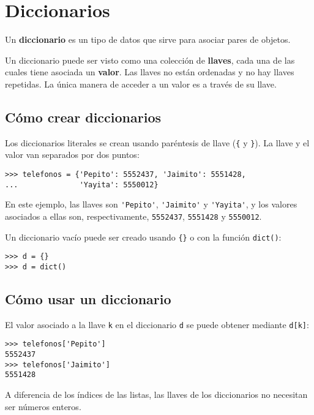 \chapter{Diccionarios}

Un \textbf{diccionario} es un tipo de datos que sirve para asociar pares
de objetos.

Un diccionario puede ser visto como una colección de \textbf{llaves},
cada una de las cuales tiene asociada un \textbf{valor}. Las llaves no
están ordenadas y no hay llaves repetidas. La única manera de acceder a
un valor es a través de su llave.

\section{Cómo crear diccionarios}

Los diccionarios literales se crean usando paréntesis de llave
(\lstinline!{! y \lstinline!}!).
La llave y el valor van separados por dos puntos:
\begin{lstlisting}
>>> telefonos = {'Pepito': 5552437, 'Jaimito': 5551428,
...              'Yayita': 5550012}
\end{lstlisting}

En este ejemplo, las llaves son \lstinline!'Pepito'!,
\lstinline!'Jaimito'! y \lstinline!'Yayita'!, y los valores asociados a
ellas son, respectivamente, \lstinline!5552437!, \lstinline!5551428! y
\lstinline!5550012!.

Un diccionario vacío puede ser creado usando \lstinline!{}! o con la
función \lstinline!dict()!:

\begin{lstlisting}
>>> d = {}
>>> d = dict()
\end{lstlisting}

\section{Cómo usar un diccionario}

El valor asociado a la llave \lstinline!k! en el diccionario
\lstinline!d! se puede obtener mediante \lstinline!d[k]!:

\begin{lstlisting}
>>> telefonos['Pepito']
5552437
>>> telefonos['Jaimito']
5551428
\end{lstlisting}

A diferencia de los índices de las listas, las llaves de los
diccionarios no necesitan ser números enteros.

